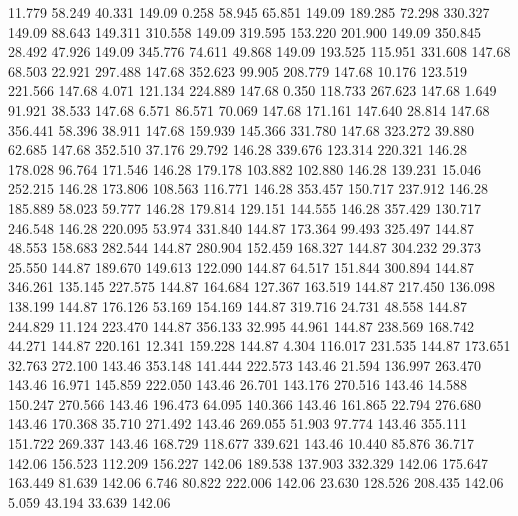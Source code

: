   11.779   58.249   40.331       149.09
   0.258   58.945   65.851       149.09
 189.285   72.298  330.327       149.09
  88.643  149.311  310.558       149.09
 319.595  153.220  201.900       149.09
 350.845   28.492   47.926       149.09
 345.776   74.611   49.868       149.09
 193.525  115.951  331.608       147.68
  68.503   22.921  297.488       147.68
 352.623   99.905  208.779       147.68
  10.176  123.519  221.566       147.68
   4.071  121.134  224.889       147.68
   0.350  118.733  267.623       147.68
   1.649   91.921   38.533       147.68
   6.571   86.571   70.069       147.68
 171.161  147.640   28.814       147.68
 356.441   58.396   38.911       147.68
 159.939  145.366  331.780       147.68
 323.272   39.880   62.685       147.68
 352.510   37.176   29.792       146.28
 339.676  123.314  220.321       146.28
 178.028   96.764  171.546       146.28
 179.178  103.882  102.880       146.28
 139.231   15.046  252.215       146.28
 173.806  108.563  116.771       146.28
 353.457  150.717  237.912       146.28
 185.889   58.023   59.777       146.28
 179.814  129.151  144.555       146.28
 357.429  130.717  246.548       146.28
 220.095   53.974  331.840       144.87
 173.364   99.493  325.497       144.87
  48.553  158.683  282.544       144.87
 280.904  152.459  168.327       144.87
 304.232   29.373   25.550       144.87
 189.670  149.613  122.090       144.87
  64.517  151.844  300.894       144.87
 346.261  135.145  227.575       144.87
 164.684  127.367  163.519       144.87
 217.450  136.098  138.199       144.87
 176.126   53.169  154.169       144.87
 319.716   24.731   48.558       144.87
 244.829   11.124  223.470       144.87
 356.133   32.995   44.961       144.87
 238.569  168.742   44.271       144.87
 220.161   12.341  159.228       144.87
   4.304  116.017  231.535       144.87
 173.651   32.763  272.100       143.46
 353.148  141.444  222.573       143.46
  21.594  136.997  263.470       143.46
  16.971  145.859  222.050       143.46
  26.701  143.176  270.516       143.46
  14.588  150.247  270.566       143.46
 196.473   64.095  140.366       143.46
 161.865   22.794  276.680       143.46
 170.368   35.710  271.492       143.46
 269.055   51.903   97.774       143.46
 355.111  151.722  269.337       143.46
 168.729  118.677  339.621       143.46
  10.440   85.876   36.717       142.06
 156.523  112.209  156.227       142.06
 189.538  137.903  332.329       142.06
 175.647  163.449   81.639       142.06
   6.746   80.822  222.006       142.06
  23.630  128.526  208.435       142.06
   5.059   43.194   33.639       142.06
